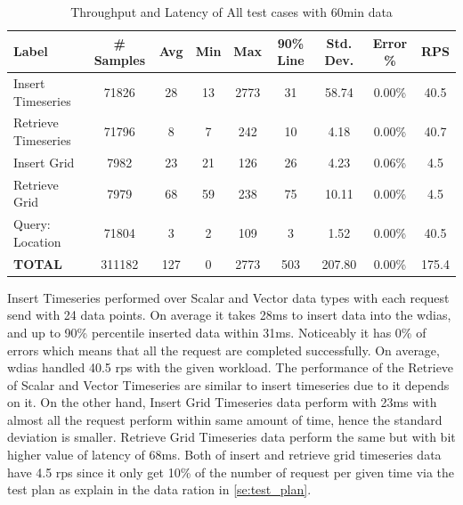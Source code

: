 \begin{table}[ht]
\footnotesize
\begin{tabulary}{\linewidth}{|L|C|C|C|C|C|C|C|C|}
\hline
Label & \# Samples & Avg & Min & Max & 90\% Line & Std. Dev. & Error \% & RPS \\ \hline
Insert Timeseries & 71826 & 28 & 13 & 2773 & 31 & 58.74 & 0.00\% & 40.5 \\ \hline
Retrieve Timeseries & 71796 & 8 & 7 & 242 & 10 & 4.18 & 0.00\% & 40.7 \\ \hline
Insert Grid & 7982 & 23 & 21 & 126 & 26 & 4.23 & 0.06\% & 4.5 \\ \hline
Retrieve Grid & 7979 & 68 & 59 & 238 & 75 & 10.11 & 0.00\% & 4.5 \\ \hline
Query: Location & 71804 & 3 & 2 & 109 & 3 & 1.52 & 0.00\% & 40.5 \\ \hline
\textbf{TOTAL} & 311182 & 127 & 0 & 2773 & 503 & 207.80 & 0.00\% & 175.4 \\ \hline
\end{tabulary}
\caption{Throughput and Latency of All test cases with 60min data}
\label{tab:obs_all_60_min_summary}
\end{table}
Insert Timeseries performed over Scalar and Vector data types with each request send with 24 data points. On average it takes 28ms to insert data into the \acrshort{wdias}, and up to 90\% percentile inserted data within 31ms. Noticeably it has 0\% of errors which means that all the request are completed successfully. On average, \acrshort{wdias} handled 40.5 \acrshort{rps} with the given workload. The performance of the Retrieve of Scalar and Vector Timeseries are similar to insert timeseries due to it depends on it.
On the other hand, Insert Grid Timeseries data perform with 23ms with almost all the request perform within same amount of time, hence the standard deviation is smaller. Retrieve Grid Timeseries data perform the same but with bit higher value of latency of 68ms. Both of insert and retrieve grid timeseries data have 4.5 \acrshort{rps} since it only get 10\% of the number of request per given time via the test plan as explain in the data ration in \ref{se:test_plan}.

